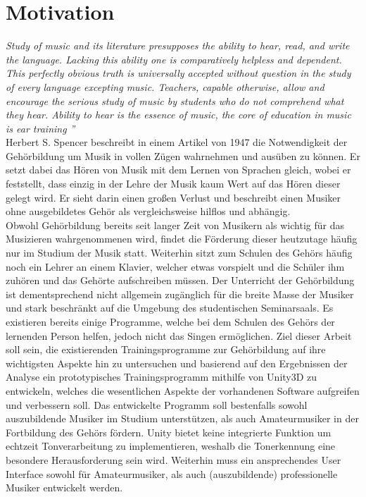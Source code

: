 \section{Motivation}
\emph{
    \glqq 
    Study of music and
    its literature presupposes the ability to hear,
    read, and write the language. Lacking this ability one is
    comparatively helpless and dependent. This perfectly
    obvious truth is universally accepted without question
    in the study of every language excepting music. Teachers, capable otherwise, allow and encourage the serious
    study of music by students who do not comprehend what
    they hear. Ability to hear is the essence of music, the
    core of education in music is ear training
  ''  \cite{spencer1947ear}
} \\
Herbert S. Spencer beschreibt in einem Artikel von 1947 die Notwendigkeit der Gehörbildung um Musik in vollen Zügen wahrnehmen und ausüben zu können. Er setzt dabei das Hören von Musik mit dem Lernen von Sprachen gleich, wobei er feststellt, dass einzig in der Lehre der Musik kaum Wert auf das Hören dieser gelegt wird. Er sieht darin einen großen Verlust und beschreibt einen Musiker ohne ausgebildetes Gehör als vergleichsweise hilflos und abhängig. \\
Obwohl Gehörbildung bereits seit langer Zeit von Musikern als wichtig für das Musizieren wahrgenommenen wird, findet die Förderung dieser heutzutage häufig nur im Studium der Musik statt. Weiterhin sitzt zum Schulen des Gehörs häufig noch ein Lehrer an einem Klavier, welcher etwas vorspielt und die Schüler ihm zuhören und das Gehörte aufschreiben müssen. Der Unterricht der Gehörbildung ist dementsprechend nicht allgemein zugänglich für die breite Masse der Musiker und stark beschränkt auf die Umgebung des studentischen Seminarsaals. Es existieren bereits einige Programme, welche bei dem Schulen des Gehörs der lernenden Person helfen, jedoch nicht das Singen ermöglichen. 
Ziel dieser Arbeit soll sein, die existierenden Trainingsprogramme zur Gehörbildung auf ihre wichtigsten Aspekte hin zu untersuchen und basierend auf den Ergebnissen der Analyse ein prototypisches Trainingsprogramm mithilfe von Unity3D zu entwickeln, welches die wesentlichen Aspekte der vorhandenen Software aufgreifen und verbessern soll. Das entwickelte Programm soll bestenfalls sowohl auszubildende Musiker im Studium unterstützen, als auch Amateurmusiker in der Fortbildung des Gehörs fördern. Unity bietet keine integrierte Funktion um echtzeit Tonverarbeitung zu implementieren, weshalb die Tonerkennung eine besondere Herausforderung sein wird. Weiterhin muss ein ansprechendes User Interface sowohl für Amateurmusiker, als auch (auszubildende) professionelle Musiker entwickelt werden. 

